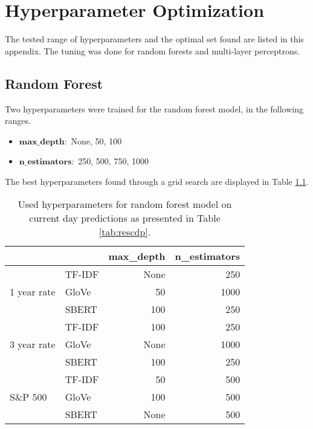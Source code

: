 \chapter{Hyperparameter Optimization}\label{appendix:B}

The tested range of hyperparameters and the optimal set found are listed in this appendix. The tuning was done for random forests and multi-layer perceptrons. 

\section{Random Forest}

Two hyperparameters were trained for the random forest model, in the following ranges.  
\begin{itemize}
    \item $\textbf{max\_depth}: $ None, 50, 100
    \item $\textbf{n\_estimators}: $ 250, 500, 750, 1000
\end{itemize}

The best hyperparameters found through a grid search are displayed in Table \ref{tab:rf_hyper_cd}.

\begin{table}[H]
    \centering
    \begin{tabular}{llrr}
          & & \textbf{max\_depth} & \textbf{n\_estimators} \\
         \hline \hline
         \multirow{3}{*}{1 year rate} & TF-IDF & None & 250  \\
         & GloVe & 50 & 1000   \\
         & SBERT & 100 & 250  \\
         \hline 
         \multirow{3}{*}{3 year rate} & TF-IDF & 100 & 250  \\
         & GloVe & None & 1000  \\
         & SBERT & 100 & 250  \\
         \hline 
         \multirow{3}{*}{S\&P 500} & TF-IDF & 50 & 500  \\
         & GloVe & 100 & 500  \\
         & SBERT & None & 500  \\
         \hline 
    \end{tabular}
    \caption{Used hyperparameters for random forest model on current day predictions as presented in Table \ref{tab:rescdp}.}
    \label{tab:rf_hyper_cd}
\end{table}

